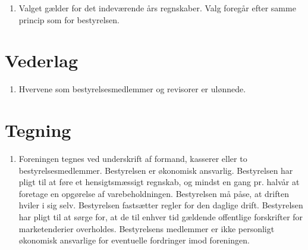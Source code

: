 \documentclass[a4paper, 10pt]{article}
\newenvironment{stykenum}{
  \begin{enumerate}[%
    label=Stk.~\arabic*., ref=\textsection~\theenumi~Stk.~\arabic*, start=1]
}{\end{enumerate}}
\begin{document}
\begin{stykenum}
\subsubsection*{Optælling}
\begin{itemize}

\item Der udregnes fordelingstal svarende til gyldige stemmer/antal poster.

\item Har nogen kandidater opnået fordelingstallet på 1.-stemmer er disse
\\ valgt. Nr. 1 er den med flest 1.-stemmer osv.

\item For de kandidater, der ikke opnår fordelingstallet med
1.-stemmer, ses på 2.-stemmer lagt sammen med 1.-stemmer. Hvis der
stadig er ubesatte poster, ses på 1.-stemmer lagt sammen med 2.stemmer
og 3.-stemmer, osv.

\item Er der stemmelighed på 1.-stemmer, er antallet af 2.-stemmer
afgørende for hvem er nr.  1, osv.

\item Har to kandidater stemmelighed ved alle prioritetsstemmer
foretages \\ lodtrækning.

\end{itemize}

\subsection*{Valg af revisorer}

\item Valget gælder for det indeværende års regnskaber. Valg foregår efter
samme princip som for bestyrelsen.
\end{stykenum}

\section{Vederlag}
\begin{stykenum}
    \item Hvervene som bestyrelsesmedlemmer og revisorer er ulønnede.
\end{stykenum}

\section{Tegning}
\begin{stykenum}
    \item Foreningen tegnes ved underskrift af formand, kasserer eller to
bestyrelses\-medlemmer. Bestyrelsen er økonomisk ansvarlig.
Bestyrelsen har pligt til at føre et hensigtsmæssigt regnskab, og
mindst en gang pr. halvår at foretage en opgørelse af
varebeholdningen. Bestyrelsen må påse, at driften hviler i sig selv.
Bestyrelsen fastsætter regler for den daglige drift. Bestyrelsen har
pligt til at sørge for, at de til enhver tid gældende offentlige
forskrifter for marketenderier overholdes. Bestyrelsens medlemmer er
ikke personligt økonomisk ansvar\-lige for eventuelle fordringer imod
foreningen.
\end{stykenum}
\end{document}
